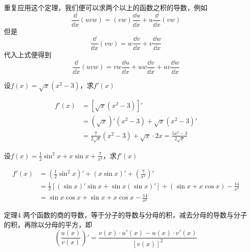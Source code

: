 重复应用这个定理，我们便可以求两个以上的函数之积的导数，例如
\[\frac{\dd }{\dd x}(uvw)=(vw)\frac{\dd u}{\dd x}+u\frac{\dd }{\dd x}(vw)\]
但是
\[\frac{\dd }{\dd x}(vw)=w\frac{\dd v}{\dd x}+v\frac{\dd w}{\dd x}\]
代入上式便得到
\[\frac{\dd }{\dd x}(uvw)=vw\frac{\dd u}{\dd x}+uw\frac{\dd v}{\dd x}+uv\frac{\dd w}{\dd x}\]


\begin{example}
    设$f(x)=\sqrt{x}(x^2-3)$，求$f'(x)$
\end{example}


\begin{solution}
    \begin{align*}
f'(x)&=\left[\sqrt{x}(x^2-3)\right]'\\
&=\left(\sqrt{x}\right)'(x^2-3)+\sqrt{x}(x^2-3)'\\
&=\frac{7}{2\sqrt{x}}(x^2-3)+\sqrt{x}\cdot 2x = \frac{5x^2-3}{2\sqrt{x}}
    \end{align*}
\end{solution}

\begin{example}
    设$f(x)=\frac{1}{2}\sin^2 x+x\sin x+\frac{7}{x^2}$，求$f'(x)$
\end{example}

\begin{solution}
\begin{align*}
    f'(x)&=\left(\frac{1}{2}\sin^2 x\right)'+(x\sin x)'+\left(\frac{7}{x^2}\right)'\\
    &=\frac{1}{2}\left[(\sin x)'\sin x+\sin x(\sin x)'\right]+(\sin x+x\cos x)-\frac{14}{x^3}\\
    &=\sin x\cos x+\sin x+x\cos x-\frac{14}{x^3}
\end{align*}
\end{solution}

\begin{blk}
    {定理4} 两个函数的商的导数，等于分子的导数与分母的积，减去分母的导数与分子的积，再除以分母的平方，即
\[\left(\frac{u(x)}{v(x)}\right)'=\frac{v(x)\cdot u'(x)-u(x)\cdot v'(x)}{[v(x)]^2}\]
\end{blk}

